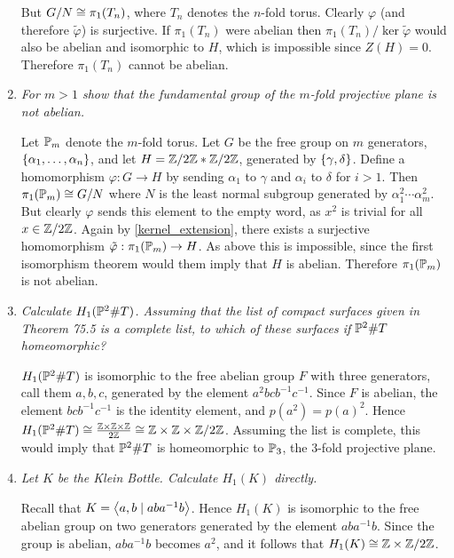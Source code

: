 \documentclass[10pt]{article}
\begin{document}
\begin{enumerate}
But $G/N \iso \pi_1(T_n)$, where $T_n$ denotes the $n$-fold torus.  Clearly $\varphi$ (and therefore $\tilde{\varphi}$) is surjective.  If $\pi_1(T_n)$ were abelian then $\pi_1(T_n) / \ker \tilde{\varphi}$ would also be abelian and isomorphic to $H$, which is impossible since $Z(H) = 0$.  Therefore $\pi_1(T_n)$ cannot be abelian.

\item \emph{For $m > 1$ show that the fundamental group of the $m$-fold projective plane is not abelian.}

Let $\P_m$ denote the $m$-fold torus.  Let $G$ be the free group on $m$ generators, $\set{\alpha_1, \ldots, \alpha_n}$, and let $H = \Z/2\Z \ast \Z/2\Z$, generated by $\set{\gamma, \delta}$.  Define a homomorphism $\varphi: G \rightarrow H$ by sending $\alpha_1$ to $\gamma$ and $\alpha_i$ to $\delta$ for $i > 1$.  Then $\pi_1(\P_m) \iso G/N$ where $N$ is the least normal subgroup generated by $\alpha_1^2 \cdots \alpha_m^2$.  But clearly $\varphi$ sends this element to the empty word, as $x^2$ is trivial for all $x \in \Z/2\Z$.  Again by \eqref{kernel_extension}, there exists a surjective homomorphism $\tilde{\varphi}: \pi_1(\P_m) \rightarrow H$.  As above this is impossible, since the first isomorphism theorem would them imply that $H$ is abelian.  Therefore $\pi_1(\P_m)$ is not abelian.

\item \emph{Calculate $H_1(\P^2 \# T)$.  Assuming that the list of compact surfaces given in Theorem 75.5 is a complete list, to which of these surfaces if $\P^2 \# T$ homeomorphic?}

$H_1(\P^2 \# T)$ is isomorphic to the free abelian group $F$ with three generators, call them $a,b,c$, generated by the element $a^2bcb^{-1}c^{-1}$.  Since $F$ is abelian, the element $bcb^{-1}c^{-1}$ is the identity element, and $p(a^2) = p(a)^2$.  Hence $H_1(\P^2 \# T) \iso \frac{\Z \times \Z \times \Z}{2 \Z} \iso \Z \times \Z \times \Z/2\Z$.  Assuming the list is complete, this would imply that $\P^2 \# T$ is homeomorphic to $\P_3$, the $3$-fold projective plane.

\item \emph{Let $K$ be the Klein Bottle.  Calculate $H_1(K)$ directly.}

Recall that $K = \brac{a,b \mid aba^{-1}b}$.  Hence $H_1(K)$ is isomorphic to the free abelian group on two generators generated by the element $aba^{-1}b$.  Since the group is abelian, $aba^{-1}b$ becomes $a^2$, and it follows that $H_1(K) \iso \Z \times \Z/2\Z$.


\end{enumerate}
\end{document}
